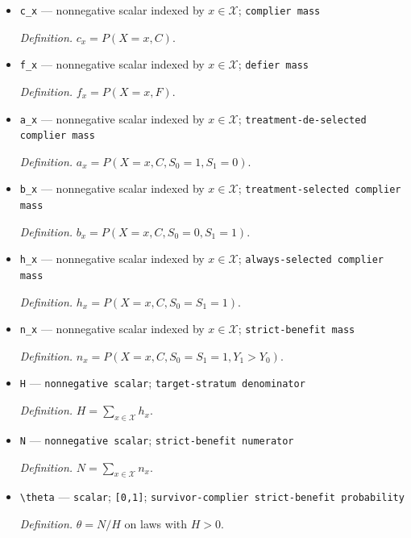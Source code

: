 \documentclass{article}
\begin{document}
\begin{itemize}
  \par\smallskip\noindent\emph{Definition.} \(F=\{D_0=1,D_1=0\}\).
  \item \texttt{c\_\allowbreak{}x} --- nonnegative scalar indexed by \(x\in\mathcal X\); \texttt{complier mass}
  \par\smallskip\noindent\emph{Definition.} \(c_x=P(X=x,C)\).
  \item \texttt{f\_\allowbreak{}x} --- nonnegative scalar indexed by \(x\in\mathcal X\); \texttt{defier mass}
  \par\smallskip\noindent\emph{Definition.} \(f_x=P(X=x,F)\).
  \item \texttt{a\_\allowbreak{}x} --- nonnegative scalar indexed by \(x\in\mathcal X\); \texttt{treatment-\allowbreak{}de-\allowbreak{}selected complier mass}
  \par\smallskip\noindent\emph{Definition.} \(a_x=P(X=x,C,S_0=1,S_1=0)\).
  \item \texttt{b\_\allowbreak{}x} --- nonnegative scalar indexed by \(x\in\mathcal X\); \texttt{treatment-\allowbreak{}selected complier mass}
  \par\smallskip\noindent\emph{Definition.} \(b_x=P(X=x,C,S_0=0,S_1=1)\).
  \item \texttt{h\_\allowbreak{}x} --- nonnegative scalar indexed by \(x\in\mathcal X\); \texttt{always-\allowbreak{}selected complier mass}
  \par\smallskip\noindent\emph{Definition.} \(h_x=P(X=x,C,S_0=S_1=1)\).
  \item \texttt{n\_\allowbreak{}x} --- nonnegative scalar indexed by \(x\in\mathcal X\); \texttt{strict-\allowbreak{}benefit mass}
  \par\smallskip\noindent\emph{Definition.} \(n_x=P(X=x,C,S_0=S_1=1,Y_1>Y_0)\).
  \item \texttt{H} --- \texttt{nonnegative scalar}; \texttt{target-\allowbreak{}stratum denominator}
  \par\smallskip\noindent\emph{Definition.} \(H=\sum_{x\in\mathcal X}h_x\).
  \item \texttt{N} --- \texttt{nonnegative scalar}; \texttt{strict-\allowbreak{}benefit numerator}
  \par\smallskip\noindent\emph{Definition.} \(N=\sum_{x\in\mathcal X}n_x\).
  \item \texttt{\textbackslash{}\allowbreak{}theta} --- \texttt{scalar}; \texttt{[0,\allowbreak{}1]}; \texttt{survivor-\allowbreak{}complier strict-\allowbreak{}benefit probability}
  \par\smallskip\noindent\emph{Definition.} \(\theta=N/H\) on laws with \(H>0\).

\end{itemize}
\end{document}
